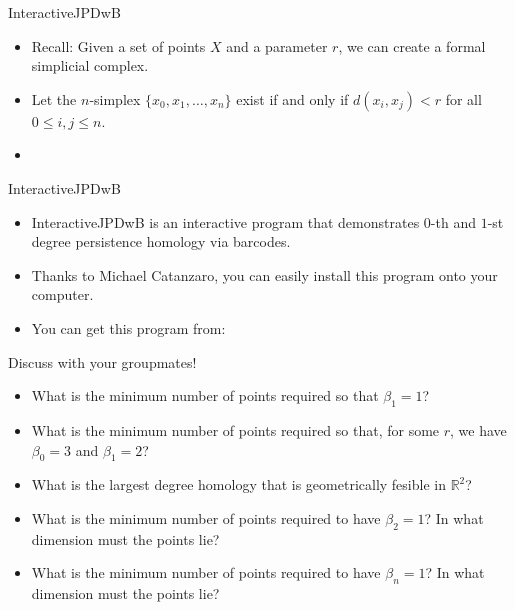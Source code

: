 \begin{frame}{InteractiveJPDwB}
\begin{itemize}
\item<1-> Recall: Given a set of points $X$ and a parameter $r$, we can create a formal simplicial complex.
\item<2-> Let the $n$-simplex $\{x_0, x_1, \ldots, x_n\}$ exist if and only if $d(x_i, x_j) < r$ for all $0 \leq i,j\leq n$. 
\item<3-> 
\end{itemize}
\end{frame}


\begin{frame}{InteractiveJPDwB}
\begin{itemize}
\item<1-> InteractiveJPDwB \cite{Wolcott2016InteractiveJPDwB} is an interactive program that demonstrates $0$-th and $1$-st degree persistence homology via barcodes.
\item<2-> Thanks to Michael Catanzaro, you can easily install this program onto your computer.
\item<3-> You can get this program from:
\end{itemize}
\end{frame}
\begin{frame}{Discuss with your groupmates!}
\begin{itemize}
\item What is the minimum number of points required so that $\beta_1 = 1$?
\item What is the minimum number of points required so that, for some $r$, we have $\beta_0 = 3$ and $\beta_1 = 2$?
\item What is the largest degree homology that is geometrically fesible in $\mathbb{R}^2$?
\item What is the minimum number of points required to have $\beta_2 = 1$? In what dimension must the points lie?
\item What is the minimum number of points required to have $\beta_n = 1$?  In what dimension must the points lie?
\end{itemize}
\end{frame}
